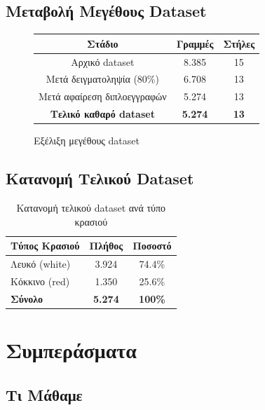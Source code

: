 \documentclass[12pt,a4paper]{article}
\begin{document}
\subsection{Μεταβολή Μεγέθους Dataset}

\begin{figure}[H]
\centering
\begin{tabular}{|c|c|c|}
\hline
\textbf{Στάδιο} & \textbf{Γραμμές} & \textbf{Στήλες} \\
\hline
Αρχικό dataset & 8.385 & 15 \\
\hline
Μετά δειγματοληψία (80\%) & 6.708 & 13 \\
\hline
Μετά αφαίρεση διπλοεγγραφών & 5.274 & 13 \\
\hline
\textbf{Τελικό καθαρό dataset} & \textbf{5.274} & \textbf{13} \\
\hline
\end{tabular}
\caption{Εξέλιξη μεγέθους dataset}
\end{figure}

\subsection{Κατανομή Τελικού Dataset}

\begin{table}[H]
\centering
\caption{Κατανομή τελικού dataset ανά τύπο κρασιού}
\begin{tabular}{@{}lcc@{}}
\toprule
\textbf{Τύπος Κρασιού} & \textbf{Πλήθος} & \textbf{Ποσοστό} \\
\midrule
Λευκό (white) & 3.924 & 74.4\% \\
Κόκκινο (red) & 1.350 & 25.6\% \\
\midrule
\textbf{Σύνολο} & \textbf{5.274} & \textbf{100\%} \\
\bottomrule
\end{tabular}
\end{table}

\section{Συμπεράσματα}

\subsection{Τι Μάθαμε}
\end{document}
